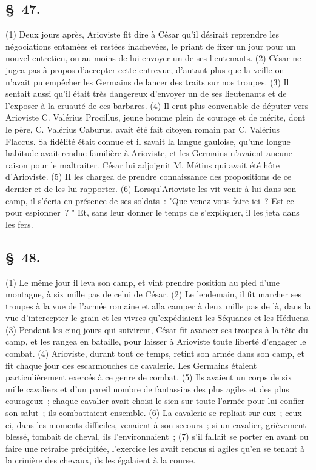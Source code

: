 \documentclass[french,twoside]{book} %
\begin{document}
\subsection[{§ 47.}]{ \textsc{§ 47.} }
\noindent (1) Deux jours après, Arioviste fit dire à César qu’il désirait reprendre les négociations entamées et restées inachevées, le priant de fixer un jour pour un nouvel entretien, ou au moins de lui envoyer un de ses lieutenants. (2) César ne jugea pas à propos d’accepter cette entrevue, d’autant plus que la veille on n’avait pu empêcher les Germains de lancer des traits sur nos troupes. (3) Il sentait aussi qu’il était très dangereux d’envoyer un de ses lieutenants et de l’exposer à la cruauté de ces barbares. (4) Il crut plus convenable de députer vers Arioviste C. Valérius Procillus, jeune homme plein de courage et de mérite, dont le père, C. Valérius Caburus, avait été fait citoyen romain par C. Valérius Flaccus. Sa fidélité était connue et il savait la langue gauloise, qu’une longue habitude avait rendue familière à Arioviste, et les Germains n’avaient aucune raison pour le maltraiter. César lui adjoignit M. Métius qui avait été hôte d’Arioviste. (5) II les chargea de prendre connaissance des propositions de ce dernier et de les lui rapporter. (6) Lorsqu’Arioviste les vit venir à lui dans son camp, il s’écria en présence de ses soldats : "Que venez-vous faire ici ? Est-ce pour espionner ? " Et, sans leur donner le temps de s’expliquer, il les jeta dans les fers.
\subsection[{§ 48.}]{ \textsc{§ 48.} }
\noindent (1) Le même jour il leva son camp, et vint prendre position au pied d’une montagne, à six mille pas de celui de César. (2) Le lendemain, il fit marcher ses troupes à la vue de l’armée romaine et alla camper à deux mille pas de là, dans la vue d’intercepter le grain et les vivres qu’expédiaient les Séquanes et les Héduens. (3) Pendant les cinq jours qui suivirent, César fit avancer ses troupes à la tête du camp, et les rangea en bataille, pour laisser à Arioviste toute liberté d’engager le combat. (4) Arioviste, durant tout ce temps, retint son armée dans son camp, et fit chaque jour des escarmouches de cavalerie. Les Germains étaient particulièrement exercés à ce genre de combat. (5) Ils avaient un corps de six mille cavaliers et d’un pareil nombre de fantassins des plus agiles et des plus courageux ; chaque cavalier avait choisi le sien sur toute l’armée pour lui confier son salut ; ils combattaient ensemble. (6) La cavalerie se repliait sur eux ; ceux-ci, dans les moments difficiles, venaient à son secours ; si un cavalier, grièvement blessé, tombait de cheval, ils l’environnaient ; (7) s’il fallait se porter en avant ou faire une retraite précipitée, l’exercice les avait rendus si agiles qu’en se tenant à la crinière des chevaux, ils les égalaient à la course.
\end{document}
